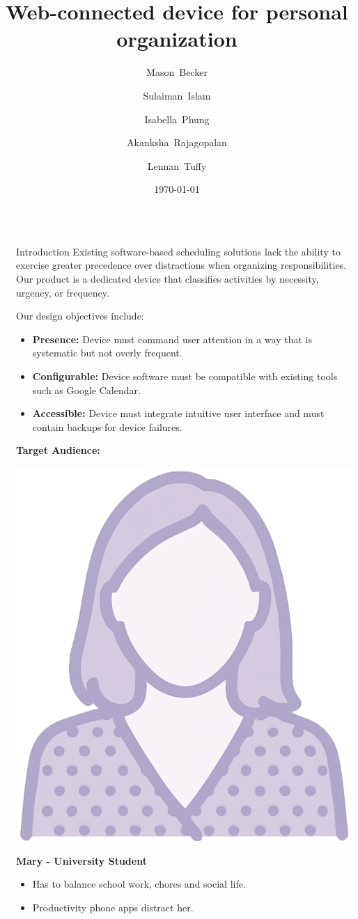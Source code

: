 \documentclass[final, cmyk]{beamer}
\title{Web-connected device for personal organization}
\author{
  Mason~Becker
  \and
  Sulaiman~Islam
  \and
  Isabella~Phung
  \and
  Akanksha~Rajagopalan
  \and
  Lennan~Tuffy
}
\institute[UC Santa Cruz]{CSE 123 - Supervised by Prof. David Harrison and Charlie Alders}
\date{\today}
\newlength{\sepwidth}
\newlength{\colwidth}
\newcommand{\separatorcolumn}{\begin{column}{\sepwidth}\end{column}}
\begin{document}
\begin{frame}[t]
  \begin{columns}[t]
    \separatorcolumn

    \begin{column}{\colwidth}

      \begin{block}{Introduction}
        Existing software-based scheduling solutions lack the ability to exercise 
        greater precedence over distractions when organizing responsibilities. Our product is a dedicated device that classifies activities by necessity, urgency, or frequency.

        Our design objectives include:
        \begin{itemize}
            \item \textbf{Presence:} Device must command user attention in a way that is systematic but not overly frequent.
            \item \textbf{Configurable:} Device software must be compatible with existing tools such as Google Calendar.
            \item \textbf{Accessible:} Device must integrate intuitive user interface and must contain backups for device failures. 
        \end{itemize}
       
        \textbf{Target Audience:}
        \newline
        \newline
        \noindent\begin{minipage}{0.3\linewidth}
        \centering
        \includegraphics[width=0.5\linewidth]{Camillia_CMYK.pdf}
        \end{minipage}
        \hfill
        \begin{minipage}{0.7\linewidth}
          \textbf{Mary - University Student}
        \begin{itemize}
            \item Has to balance school work, chores and social life.
            \item Productivity phone apps distract her.
        \end{itemize}
        \end{minipage}


\end{block}
\end{column}
\end{columns}
\end{frame}
\end{document}
